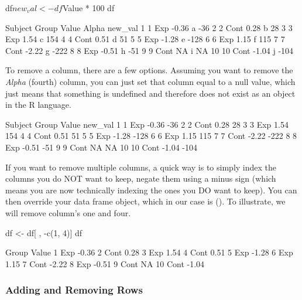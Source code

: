 \begin{inR}
df$new_val <- df$Value * 100
df
\end{inR}
\begin{outR}
   Subject Group Value Alpha new_val
1        1   Exp -0.36     a     -36
2        2  Cont  0.28     b      28
3        3   Exp  1.54     c     154
4        4  Cont  0.51     d      51
5        5   Exp -1.28     e    -128
6        6   Exp  1.15     f     115
7        7  Cont -2.22     g    -222
8        8   Exp -0.51     h     -51
9        9  Cont    NA     i      NA
10      10  Cont -1.04     j    -104
\end{outR}

To remove a column, there are a few options. Assuming you want to remove the \textit{Alpha} (fourth) column, you can just set that column equal to a \gls{null value}, which just means that something is undefined and therefore does not exist as an object in the R language.

\begin{outR}
   Subject Group Value new_val
1        1   Exp -0.36     -36
2        2  Cont  0.28      28
3        3   Exp  1.54     154
4        4  Cont  0.51      51
5        5   Exp -1.28    -128
6        6   Exp  1.15     115
7        7  Cont -2.22    -222
8        8   Exp -0.51     -51
9        9  Cont    NA      NA
10      10  Cont -1.04    -104
\end{outR}

If you want to remove multiple columns, a quick way is to simply index the columns you do NOT want to keep, negate them using a minus sign (which means you are now technically indexing the ones you DO want to keep).  You can then override your data frame object, which in our case is (). To illustrate, we will remove column's one and four.

\begin{inR}
df <- df[ , -c(1, 4)]
df
\end{inR}
\begin{outR}
   Group Value
1    Exp -0.36
2   Cont  0.28
3    Exp  1.54
4   Cont  0.51
5    Exp -1.28
6    Exp  1.15
7   Cont -2.22
8    Exp -0.51
9   Cont    NA
10  Cont -1.04
\end{outR}

\subsubsection{Adding and Removing Rows}

